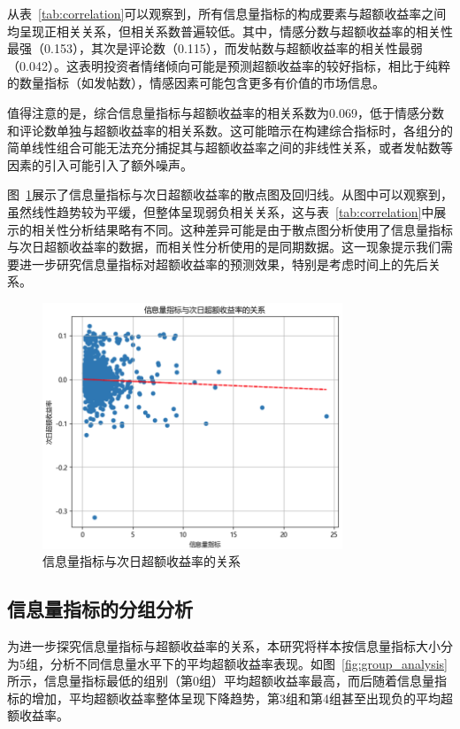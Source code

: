 \documentclass[12pt, a4paper]{article}
\begin{document}
从表~\ref{tab:correlation}可以观察到，所有信息量指标的构成要素与超额收益率之间均呈现正相关关系，但相关系数普遍较低。其中，情感分数与超额收益率的相关性最强（0.153），其次是评论数（0.115），而发帖数与超额收益率的相关性最弱（0.042）。这表明投资者情绪倾向可能是预测超额收益率的较好指标，相比于纯粹的数量指标（如发帖数），情感因素可能包含更多有价值的市场信息。

值得注意的是，综合信息量指标与超额收益率的相关系数为0.069，低于情感分数和评论数单独与超额收益率的相关系数。这可能暗示在构建综合指标时，各组分的简单线性组合可能无法充分捕捉其与超额收益率之间的非线性关系，或者发帖数等因素的引入可能引入了额外噪声。

图~\ref{fig:scatter_plot}展示了信息量指标与次日超额收益率的散点图及回归线。从图中可以观察到，虽然线性趋势较为平缓，但整体呈现弱负相关关系，这与表~\ref{tab:correlation}中展示的相关性分析结果略有不同。这种差异可能是由于散点图分析使用了信息量指标与次日超额收益率的数据，而相关性分析使用的是同期数据。这一现象提示我们需要进一步研究信息量指标对超额收益率的预测效果，特别是考虑时间上的先后关系。

\begin{figure}[htbp]
\centering
\includegraphics[width=0.8\textwidth]{fig/scatter_plot.png}
\caption{信息量指标与次日超额收益率的关系}
\label{fig:scatter_plot}
\end{figure}

\subsection{信息量指标的分组分析}

为进一步探究信息量指标与超额收益率的关系，本研究将样本按信息量指标大小分为5组，分析不同信息量水平下的平均超额收益率表现。如图~\ref{fig:group_analysis}所示，信息量指标最低的组别（第0组）平均超额收益率最高，而后随着信息量指标的增加，平均超额收益率整体呈现下降趋势，第3组和第4组甚至出现负的平均超额收益率。
\end{document}
